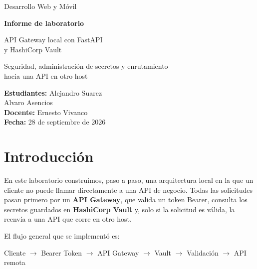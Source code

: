 \documentclass[11pt,a4paper]{article}
\begin{document}
\begin{titlepage}
  \centering
  \vspace*{3cm}
  {\Large Desarrollo Web y Móvil\par}
  \vspace{1.5cm}
  {\huge\bfseries Informe de laboratorio\par}
  \vspace{0.5cm}
  {\LARGE API Gateway local con FastAPI\\ y HashiCorp Vault\par}
  \vspace{0.8cm}
  {\large Seguridad, administración de secretos y enrutamiento\\ hacia una API en otro host\par}
  \vfill
  {\large
  \textbf{Estudiantes:} Alejandro Suarez\\
  \hspace{2.95cm}Alvaro Asencios\\[0.4cm]
  \textbf{Docente:} Ernesto Vivanco\\[0.4cm]
  \textbf{Fecha:} 28 de septiembre de 2026\par}
  \vspace{2cm}
\end{titlepage}

\tableofcontents
\newpage

\section{Introducción}

En este laboratorio construimos, paso a paso, una arquitectura local en la que un cliente no puede llamar directamente a una API de negocio. Todas las solicitudes pasan primero por un \textbf{API Gateway}, que valida un token Bearer, consulta los secretos guardados en \textbf{HashiCorp Vault} y, solo si la solicitud es válida, la reenvía a una API que corre en otro host.

El flujo general que se implementó es:

\begin{center}
Cliente $\rightarrow$ Bearer Token $\rightarrow$ API Gateway $\rightarrow$ Vault $\rightarrow$ Validación $\rightarrow$ API remota
\end{center}
\end{document}
